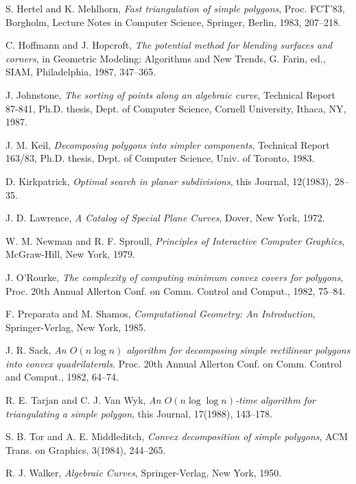 \begin{thebibliography}{Abhyankar 87b}
S. Hertel and K. Mehlhorn, 
{\em Fast triangulation of simple polygons},
Proc. FCT'83, Borgholm, Lecture Notes in Computer Science, 
Springer, Berlin, 1983, 207--218.

C. Hoffmann and J. Hopcroft, 
{\em The potential method for blending surfaces and corners},
in Geometric Modeling: Algorithms and New Trends, G. Farin, ed.,
SIAM, Philadelphia, 1987, 347--365.

\clearpage

J. Johnstone, 
{\em The sorting of points along an algebraic curve}, 
Technical Report 87-841, Ph.D. thesis, Dept. of Computer Science, 
Cornell University, Ithaca, NY, 1987.

J. M. Keil, 
{\em Decomposing polygons into simpler components}, 
Technical Report 163/83, Ph.D. thesis, Dept. of Computer Science, 
Univ. of Toronto, 1983.

D. Kirkpatrick, 
{\em Optimal search in planar subdivisions}, 
this Journal, 12(1983), 28--35.

J. D. Lawrence, 
{\em A Catalog of Special Plane Curves}, 
Dover, New York, 1972.


W. M. Newman and R. F. Sproull, 
{\em Principles of Interactive Computer Graphics},
McGraw-Hill, New York, 1979.


J. O'Rourke, 
{\em The complexity of computing minimum convex covers for polygons},
Proc. 20th Annual Allerton Conf. on Comm. Control and Comput., 1982, 75--84.

F. Preparata and M. Shamos, 
{\em Computational Geometry: An Introduction},
Springer-Verlag, New York, 1985.

J. R. Sack,
{\em An $O(n \log n)$ algorithm for decomposing simple rectilinear polygons
into convex quadrilaterals}.
Proc. 20th Annual Allerton Conf. on Comm. Control and Comput., 1982, 64--74.

R. E. Tarjan and C. J. Van Wyk,
{\em An $O(n \log \log n)$-time algorithm for triangulating a simple polygon},
this Journal, 17(1988), 143--178.

S. B. Tor and A. E. Middleditch,
{\em Convex decomposition of simple polygons},
ACM Trans. on Graphics, 3(1984), 244--265.

R. J. Walker,
{\em Algebraic Curves},
Springer-Verlag, New York, 1950.

\end{thebibliography}
%

